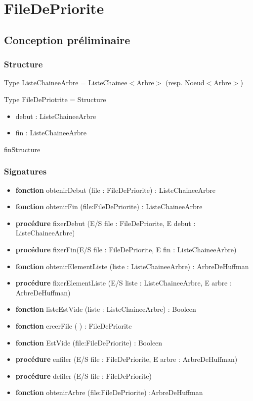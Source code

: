     \section*{FileDePriorite}
    \subsection*{Conception préliminaire}
    \subsubsection*{Structure}
 
    Type ListeChaineeArbre = ListeChainee$<$Arbre$>$ (resp. Noeud$<$Arbre$>$)
 
    Type FileDePriotrite = Structure
	\begin{itemize}[label=$\ $, leftmargin=2cm]
		 \item debut : ListeChaineeArbre
		 \item fin : ListeChaineeArbre
	\end{itemize}
 
    finStructure
 
	\subsubsection*{Signatures}
	
    \begin{itemize}[label=$\ $, leftmargin=1cm]
        \item \textbf{fonction} obtenirDebut (file : FileDePriorite) : ListeChaineeArbre
        \item \textbf{fonction} obtenirFin (file:FileDePriorite) : ListeChaineeArbre
        \item \textbf{procédure} fixerDebut (E/S file : FileDePriorite, E debut : ListeChaineeArbre)
        \item \textbf{procédure} fixerFin(E/S file : FileDePriorite, E fin : ListeChaineeArbre)
        \item \textbf{fonction} obtenirElementListe (liste : ListeChaineeArbre) : ArbreDeHuffman
        \item \textbf{procédure} fixerElementListe (E/S liste : ListeChaineeArbre, E arbre : ArbreDeHuffman)
        \item \textbf{fonction} listeEstVide (liste : ListeChaineeArbre) : Booleen
        \item \textbf{fonction} creerFile ( ) : FileDePriorite
        \item \textbf{fonction} EstVide (file:FileDePriorite) : Booleen
        \item \textbf{procédure} enfiler (E/S file :  FileDePriorite, E arbre : ArbreDeHuffman)
        \item \textbf{procédure} defiler (E/S file :  FileDePriorite)
        \item \textbf{fonction} obtenirArbre (file:FileDePriorite) :ArbreDeHuffman
    \end{itemize} 
    

